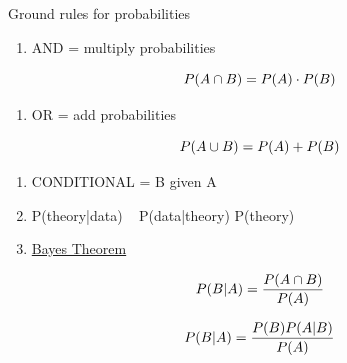\documentclass[aspectratio=1610,pdftex,dvipsnames,compress,xcolor={dvipsnames}]{beamer}
\begin{document}
\begin{frame}{Ground rules for probabilities}
    \begin{enumerate}[series=outerlist,topsep=0pt,itemsep=3pt,leftmargin=*,label=(\arabic*)]
        \item[]AND = multiply probabilities
    \end{enumerate}

    \vspace*{\fill}

    \begin{equation}
        \Large
        P(A \cap B) = P(A) \cdot P(B)
    \end{equation}

    \vspace*{\fill}

    \begin{enumerate}[series=outerlist,topsep=0pt,itemsep=3pt,leftmargin=*,label=(\arabic*)]
        \item[]OR = add probabilities
    \end{enumerate}

    \vspace*{\fill}

    \begin{equation}
        \Large
        P(A \cup B) = P(A) + P(B)
    \end{equation}

    \vspace*{\fill}

    \begin{enumerate}[series=outerlist,topsep=0pt,itemsep=5pt,leftmargin=*,label=(\arabic*)]
        \item[]CONDITIONAL = B given A
        \item[]P(theory|data) ~ P(data|theory) P(theory)
            \vspace{0.10in}
        \item[]\href{https://uidaho.pressbooks.pub/riskassessment/chapter/bayes-theorem/}{Bayes Theorem}
    \end{enumerate}

    \vspace*{\fill}

    \begin{equation}
        \Large
        P(B|A) = \frac{P(A \cap B)}{P(A)}
    \end{equation}

    \begin{equation}
        \Large
        P(B|A) = \frac{P(B) P(A|B)}{P(A)}
    \end{equation}
\end{frame}
\end{document}
